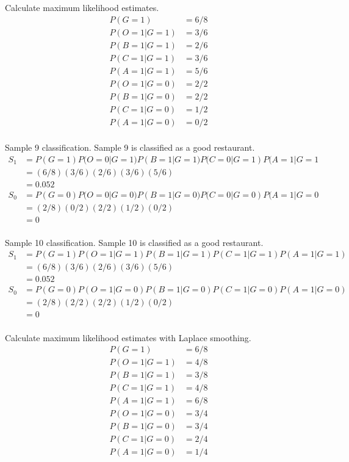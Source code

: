 \documentclass[newpage]{homework}
\begin{document}
\question
Calculate maximum likelihood estimates.
\begin{align*}
    P(G=1)	&=  6/8	\\
    P(O=1|G=1)  &=    3/6 \\
    P(B=1|G=1)  &=    2/6	\\
    P(C=1|G=1)  &=    3/6 \\
    P(A=1|G=1)  &=    5/6 \\
    P(O=1|G=0)  &=    2/2 \\
    P(B=1|G=0)  &=    2/2	\\
    P(C=1|G=0)  &=    1/2 \\
    P(A=1|G=0)  &=    0/2 \\
\end{align*}

Sample 9 classification. Sample 9 is classified as a good restaurant.
\begin{align*}
    S_1 &=  P(G=1)P(O=0|G=1)P(B=1|G=1)P(C=0|G=1)P(A=1|G=1   \\
        &=  (6/8)(3/6)(2/6)(3/6)(5/6)\\
        &=  0.052   \\
    S_0 &=  P(G=0)P(O=0|G=0)P(B=1|G=0)P(C=0|G=0)P(A=1|G=0   \\
        &=  (2/8)(0/2)(2/2)(1/2)(0/2)\\
        &=  0   \\
\end{align*}

Sample 10 classification. Sample 10 is classified as a good restaurant.
\begin{align*}
    S_1 &=  P(G=1)P(O=1|G=1)P(B=1|G=1)P(C=1|G=1)P(A=1|G=1)   \\
        &=	(6/8)(3/6)  (2/6)  (3/6)  (5/6)	\\
        &=  0.052 \\
    S_0 &=  P(G=0)P(O=1|G=0)P(B=1|G=0)P(C=1|G=0)P(A=1|G=0)   \\
        &=	(2/8)(2/2)  (2/2)  (1/2)  (0/2)	\\
        &=  0 \\
\end{align*}

Calculate maximum likelihood estimates with Laplace smoothing.
\begin{align*}
    P(G=1)	&=  6/8	\\
    P(O=1|G=1)  &=    4/8 \\
    P(B=1|G=1)  &=    3/8	\\
    P(C=1|G=1)  &=    4/8 \\
    P(A=1|G=1)  &=    6/8 \\
    P(O=1|G=0)  &=    3/4 \\
    P(B=1|G=0)  &=    3/4	\\
    P(C=1|G=0)  &=    2/4 \\
    P(A=1|G=0)  &=    1/4 \\
\end{align*}
\end{document}
